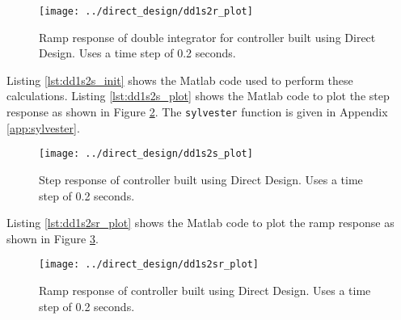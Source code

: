 \documentclass{article}
\newcommand{\sincludepdf}[2][]{
	
}
\begin{document}
\begin{figure}
\begin{center}
\texttt{[image: ../direct\_design/dd1s2r\_plot]}
\end{center}
\caption{Ramp response of double integrator for controller built
using Direct Design. Uses a time step of 0.2 seconds.}
\label{fig:dd1s2r_plot}
\end{figure}


\sincludepdf[pages=3,
			pagecommand=\subsection*{Example 2}
	]{scan/11251301.pdf}
\sincludepdf[pages=4-6]{scan/11251301.pdf}

Listing \ref{lst:dd1s2s_init} shows the Matlab code used to perform
these calculations.
Listing \ref{lst:dd1s2s_plot} shows the Matlab code to plot the step response
as shown in Figure \ref{fig:dd1s2s_plot}.
The \verb+sylvester+ function is given in Appendix \ref{app:sylvester}.



\clearpage


\begin{figure}
\begin{center}
\texttt{[image: ../direct\_design/dd1s2s\_plot]}
\end{center}
\caption{Step response of controller built
using Direct Design. Uses a time step of 0.2 seconds.}
\label{fig:dd1s2s_plot}
\end{figure}

\clearpage
Listing \ref{lst:dd1s2sr_plot} shows the Matlab code to plot the ramp response
as shown in Figure \ref{fig:dd1s2sr_plot}.



\begin{figure}
\begin{center}
\texttt{[image: ../direct\_design/dd1s2sr\_plot]}
\end{center}
\caption{Ramp response of controller built
using Direct Design. Uses a time step of 0.2 seconds.}
\label{fig:dd1s2sr_plot}
\end{figure}
\end{document}
